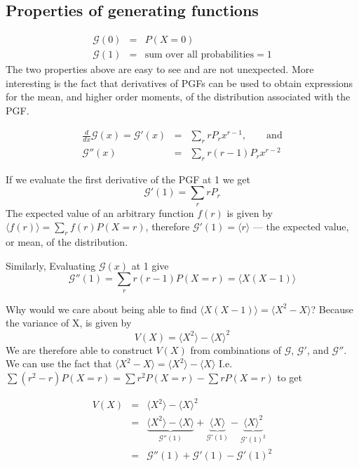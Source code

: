 \documentclass{article}
\newcommand{\calG}{\mathcal{G}}
\begin{document}
\subsection{Properties of generating functions}
\begin{eqnarray*}
	\calG(0)&=&P(X=0)\\
	\calG(1)&=&\text{sum over all probabilities}=1
\end{eqnarray*}
The two properties above are easy to see and are not unexpected. More interesting is the fact that derivatives of PGFs can be used to obtain expressions for the mean, and higher order moments, of the distribution associated with the PGF.

\begin{eqnarray*}
	\frac{d}{dx}\calG(x)=\calG'(x)&=&\sum_r rP_r x^{r-1},\qquad\text{and}\\
	\calG''(x)&=&\sum_r r(r-1)P_rx^{r-2}
\end{eqnarray*}

If we evaluate the first derivative of the PGF at 1 we get
$$\calG'(1) = \sum_r rP_r$$
The expected value of an arbitrary function $f(r)$ is given by $\langle f(r)\rangle = \sum_r f(r) P(X=r)$, therefore $\calG'(1) = \langle r\rangle$ --- the expected value, or mean, of the distribution.

Similarly,  Evaluating $\calG(x)$ at 1 give 
$$\calG''(1) = \sum_r r(r-1)P(X=r) = \langle X(X-1)\rangle$$

Why would we care about being able to find $\langle X(X-1)\rangle = \langle X^2 -X\rangle$? Because the variance of X, is given by 
$$ V(X) = \langle X^2\rangle -\langle X\rangle^2$$ We are therefore able to construct $V(X)$ from combinations of $\calG$, $\calG'$, and $\calG''$.
We can use the fact that $\langle X^2 -X\rangle =\langle X^2\rangle-\langle X\rangle$ I.e. $\sum(r^2-r)P(X=r)=\sum r^2P(X=r)-\sum rP(X=r)$ to get

\begin{eqnarray}
V(X)&=&\langle X^2\rangle - \langle X\rangle^2\\
&=&\underbrace{\langle X^2\rangle -  \langle X \rangle}_{\calG''(1)} + \underbrace{\langle X\rangle}_{\calG'(1)} - \underbrace{\langle X \rangle^2}_{\calG'(1)^2}\\
&=& \calG''(1) +\calG'(1)-\calG'(1)^2 \label{eq:binvar}
\end{eqnarray}

\end{document}
